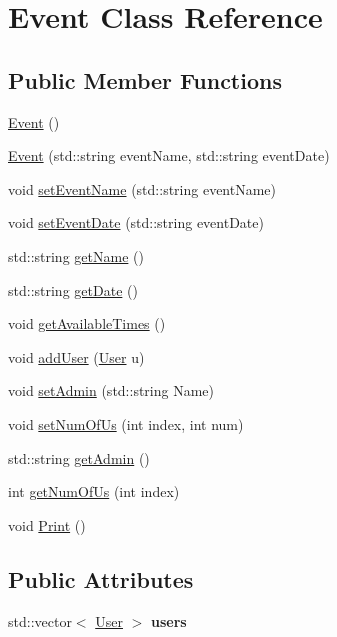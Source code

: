 \hypertarget{class_event}{}\section{Event Class Reference}
\label{class_event}
\subsection*{Public Member Functions}
\begin{DoxyCompactItemize}
\item 
\mbox{\hyperlink{class_event_a5a40dd4708297f7031e29b39e039ae10}{Event}} ()
\item 
\mbox{\hyperlink{class_event_adcbdd318d0c3237e2e829549fd426d70}{Event}} (std\+::string event\+Name, std\+::string event\+Date)
\item 
void \mbox{\hyperlink{class_event_a4c6829c10c6c865759221d57a0f4a64f}{set\+Event\+Name}} (std\+::string event\+Name)
\item 
void \mbox{\hyperlink{class_event_a0fbbd58ef1341dfacea38de7795d3667}{set\+Event\+Date}} (std\+::string event\+Date)
\item 
std\+::string \mbox{\hyperlink{class_event_adf0f3e50061123d6f24200661eeb66eb}{get\+Name}} ()
\item 
std\+::string \mbox{\hyperlink{class_event_a1fb318a969eaf352d3f507b8097bd810}{get\+Date}} ()
\item 
void \mbox{\hyperlink{class_event_a099c123993ee717521ec411838d0f719}{get\+Available\+Times}} ()
\item 
void \mbox{\hyperlink{class_event_a6cf708e6ba961e2392716dd2c53d7938}{add\+User}} (\mbox{\hyperlink{class_user}{User}} u)
\item 
void \mbox{\hyperlink{class_event_aec0fa6f68332424cdfb15855765cadf3}{set\+Admin}} (std\+::string Name)
\item 
void \mbox{\hyperlink{class_event_ab573b9da583f00cd5d60934fb594e1ac}{set\+Num\+Of\+Us}} (int index, int num)
\item 
std\+::string \mbox{\hyperlink{class_event_a61903b21fd660d7ddaa126dab671a756}{get\+Admin}} ()
\item 
int \mbox{\hyperlink{class_event_a00e5f70b33801f1081ccc434a276aca5}{get\+Num\+Of\+Us}} (int index)
\item 
void \mbox{\hyperlink{class_event_a8087f742c473db50d2dda834de64ad1f}{Print}} ()
\end{DoxyCompactItemize}
\subsection*{Public Attributes}
\begin{DoxyCompactItemize}
\item 
\mbox{\label{class_event_a78deb5cb4ee864c9ef6a90db2ad4eeab}} 
std\+::vector$<$ \mbox{\hyperlink{class_user}{User}} $>$ {\bfseries users}
\end{DoxyCompactItemize}
